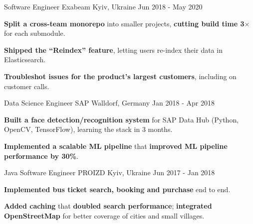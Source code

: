 \begin{cventries}
\cventry
    {Software Engineer} %
    {Exabeam} %
    {Kyiv, Ukraine} %
    {Jun 2018 - May 2020} %
    {
      \begin{cvitems} %
        \item { \textbf{Split a cross-team monorepo} into smaller projects, \textbf{cutting build time 3$\times$} for each submodule. }
        \item { \textbf{Shipped the ``Reindex'' feature}, letting users re-index their data in Elasticsearch. }
        \item { \textbf{Troubleshot issues for the product's largest customers}, including on customer calls. }
      \end{cvitems}
    }

\cventry
    {Data Science Engineer} %
    {SAP} %
    {Walldorf, Germany} %
    {Jan 2018 - Apr 2018} %
    {
      \begin{cvitems} %
        \item { \textbf{Built a face detection/recognition system} for SAP Data Hub (Python, OpenCV, TensorFlow), learning the stack in 3 months. }
        \item { \textbf{Implemented a scalable ML pipeline} that \textbf{improved ML pipeline performance by 30\%}. }
      \end{cvitems}
    }

\cventry
    {Java Software Engineer} %
    {PROIZD} %
    {Kyiv, Ukraine} %
    {Jun 2017 - Jan 2018} %
    {
      \begin{cvitems} %
        \item { \textbf{Implemented bus ticket search, booking and purchase} end to end. }
        \item { \textbf{Added caching} that \textbf{doubled search performance}; \textbf{integrated OpenStreetMap} for better coverage of cities and small villages. }
      \end{cvitems}
    }

\end{cventries}
